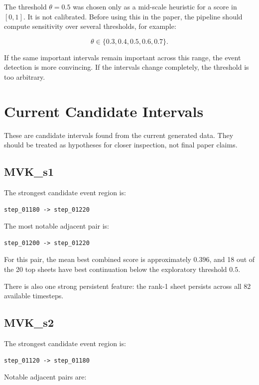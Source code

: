 \documentclass[11pt]{article}
\begin{document}
The threshold \(\theta=0.5\) was chosen only as a mid-scale heuristic for a
score in \([0,1]\). It is not calibrated. Before using this in the paper, the
pipeline should compute sensitivity over several thresholds, for example:

\[
\theta \in \{0.3,0.4,0.5,0.6,0.7\}.
\]

If the same important intervals remain important across this range, the event
detection is more convincing. If the intervals change completely, the threshold
is too arbitrary.

\section{Current Candidate Intervals}

These are candidate intervals found from the current generated data. They
should be treated as hypotheses for closer inspection, not final paper claims.

\subsection{MVK\_s1}

The strongest candidate event region is:

\begin{verbatim}
step_01180 -> step_01220
\end{verbatim}

The most notable adjacent pair is:

\begin{verbatim}
step_01200 -> step_01220
\end{verbatim}

For this pair, the mean best combined score is approximately \(0.396\), and
18 out of the 20 top sheets have best continuation below the exploratory
threshold \(0.5\).

There is also one strong persistent feature: the rank-1 sheet persists across
all 82 available timesteps.

\subsection{MVK\_s2}

The strongest candidate event region is:

\begin{verbatim}
step_01120 -> step_01180
\end{verbatim}

Notable adjacent pairs are:
\end{document}
